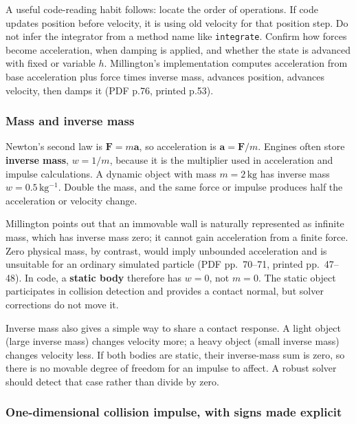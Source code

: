 A useful code-reading habit follows: locate the order of operations. If code updates position before velocity, it is using old velocity for that position step. Do not infer the integrator from a method name like \texttt{integrate}. Confirm how forces become acceleration, when damping is applied, and whether the state is advanced with fixed or variable \(h\). Millington's implementation computes acceleration from base acceleration plus force times inverse mass, advances position, advances velocity, then damps it (PDF p.76, printed p.53).

\subsubsection{Mass and inverse mass}\label{06-engine-ii-ch033-mass-and-inverse-mass}

\hypertarget{06-engine-ii-ch033-mass-and-inverse-mass}{}

Newton's second law is \(\mathbf{F}=m\mathbf{a}\), so acceleration is \(\mathbf{a}=\mathbf{F}/m\). Engines often store \textbf{inverse mass}, \(w=1/m\), because it is the multiplier used in acceleration and impulse calculations. A dynamic object with mass \(m=2\,\mathrm{kg}\) has inverse mass \(w=0.5\,\mathrm{kg^{-1}}\). Double the mass, and the same force or impulse produces half the acceleration or velocity change.

Millington points out that an immovable wall is naturally represented as infinite mass, which has inverse mass zero; it cannot gain acceleration from a finite force. Zero physical mass, by contrast, would imply unbounded acceleration and is unsuitable for an ordinary simulated particle (PDF pp.~70--71, printed pp.~47--48). In code, a \textbf{static body} therefore has \(w=0\), not \(m=0\). The static object participates in collision detection and provides a contact normal, but solver corrections do not move it.

Inverse mass also gives a simple way to share a contact response. A light object (large inverse mass) changes velocity more; a heavy object (small inverse mass) changes velocity less. If both bodies are static, their inverse-mass sum is zero, so there is no movable degree of freedom for an impulse to affect. A robust solver should detect that case rather than divide by zero.

\subsubsection{One-dimensional collision impulse, with signs made explicit}\label{06-engine-ii-ch033-one-dimensional-collision-impulse-with-signs-made-explicit}

